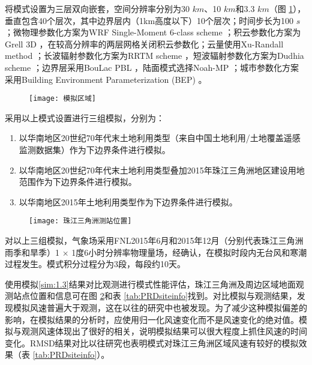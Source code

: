 将模式设置为三层双向嵌套，空间分辨率分别为30 $km$、10 $km$和3.3 $km$（图 \ref{fig:PRDmodeldomain}），垂直包含40个层次，其中边界层内（1km高度以下）10个层次；时间步长为100 $s$；微物理参数化方案为WRF Single-Moment 6-class scheme \citep{hong2006the}；积云参数化方案为Grell 3D \citep{grell1993prognostic, grell2002a}，在较高分辨率的两层网格关闭积云参数化；云量使用Xu-Randall method \citep{xu1996a}；长波辐射参数化方案为RRTM scheme \citep{mlawer1997radiative}，短波辐射参数化方案为Dudhia scheme \citep{dudhia1989numerical}；边界层采用BouLac PBL \citep{bougeault1989parameterization}，陆面模式选择Noah-MP \citep{niu2011the}；城市参数化方案采用Building Environment Parameterization (BEP) \citep{salamanca2010a}。

\begin{figure}[!htbp]
    \centering
    \texttt{[image: 模拟区域]}
    \label{fig:PRDmodeldomain}
\end{figure}

采用以上模式设置进行三组模拟，分别为：

\begin{enumerate}

\item \label{sim:1.1} 以华南地区20世纪70年代末土地利用类型（来自中国土地利用/土地覆盖遥感监测数据集）作为下边界条件进行模拟。

\item \label{sim:1.2} 以华南地区20世纪70年代末土地利用类型叠加2015年珠江三角洲地区建设用地范围作为下边界条件进行模拟。
	
\item \label{sim:1.3} 以华南地区2015年土地利用类型作为下边界条件进行模拟。

\end{enumerate}

\begin{figure}[!htbp]
    \centering
    \texttt{[image: 珠江三角洲测站位置]}
    \label{fig:PRDobssites}
\end{figure}

对以上三组模拟，气象场采用FNL2015年6月和2015年12月（分别代表珠江三角洲雨季和旱季）1 $\times$ 1度6小时分辨率物理量场，经确认，在模拟时段内无台风和寒潮过程发生。模式积分过程分为3段，每段约10天。

使用模拟\ref{sim:1.3}结果对比观测进行模式性能评估，珠江三角洲及周边区域地面观测站点位置和信息可在图 \ref{fig:PRDobssites}和表 \ref{tab:PRDsiteinfo}找到。对比模拟与观测结果，发现模拟风速普遍大于观测，这在以往的研究中也被发现\citep{zhang2010modeling, yu2015evaluation, zha2019numerical}。为了减少这种模拟偏差的影响，在模拟结果的分析时，应使用归一化风速变化而不是风速变化的绝对值。模拟与观测风速体现出了很好的相关，说明模拟结果可以很大程度上抓住风速的时间变化。RMSD结果对比以往研究\citep{zhang2010modeling, zha2019numerical}也表明模式对珠江三角洲区域风速有较好的模拟效果（表 \ref{tab:PRDsiteinfo}）。

